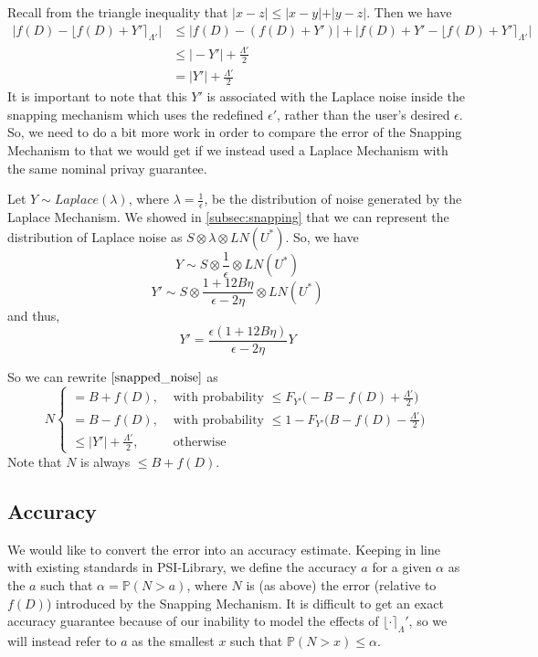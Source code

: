 \documentclass[11pt]{scrartcl} %
\begin{document}
Recall from the triangle inequality that $\vert x-z \vert \leq \vert x-y \vert + \vert y-z \vert$. Then we have
\begin{align}
\big\vert f(D) - \lfloor f(D) + Y' \rceil_{\Lambda'} \big\vert \nonumber &\leq \big\vert f(D) - (f(D) + Y') \big\vert + \big\vert f(D) + Y' - \lfloor f(D) + Y' \rceil_{\Lambda'} \big\vert \nonumber \\
                                                                        &\leq \vert -Y' \vert + \frac{\Lambda'}{2} \nonumber \\
	                                                                    &= \vert Y' \vert + \frac{\Lambda'}{2} \nonumber
\end{align}
It is important to note that this $Y'$ is associated with the Laplace noise inside the snapping mechanism which uses the redefined $\epsilon'$, rather than the user's desired $\epsilon$. So, we need to do a bit more work in order to compare the error of the Snapping Mechanism to that we would get if we instead used a Laplace Mechanism with the same nominal privay guarantee. \newline

Let $Y \sim Laplace(\lambda)$, where $\lambda = \frac{1}{\epsilon}$, be the distribution of noise generated by the Laplace Mechanism.
We showed in \autoref{subsec:snapping} that we can represent the distribution of Laplace noise as $S \otimes \lambda \otimes LN(U^*)$. So, we have
\[ Y \sim S \otimes \frac{1}{\epsilon} \otimes LN(U^*) \]
\[ Y' \sim S \otimes \frac{1 + 12B\eta}{\epsilon - 2\eta} \otimes LN(U^*) \]
and thus,
\[ Y' = \frac{\epsilon(1 + 12B\eta)}{\epsilon - 2\eta}Y \]

So we can rewrite $\eqref{snapped_noise}$ as
\begin{equation}
	\label{snapped_noise_rewrite}
	N
		\begin{cases}
			= B + f(D), &\text{ with probability } \leq F_{Y'} \big( -B - f(D) + \frac{\Lambda'}{2} \big)  \\
			= B - f(D), &\text{ with probability } \leq 1 - F_{Y'} \big( B - f(D) - \frac{\Lambda'}{2} \big)  \\
			\leq \vert Y' \vert + \frac{\Lambda'}{2}, &\text{ otherwise }
		\end{cases}
\end{equation}
Note that $N$ is always $\leq B + f(D)$.

\subsection{Accuracy}
\label{subsec:accuracy}
We would like to convert the error into an accuracy estimate. Keeping in line with existing standards in PSI-Library, we define the accuracy $a$ for a given $\alpha$ as the $a$ such that $\alpha = \mathbb{P}(N > a)$, where $N$ is (as above) the error (relative to $f(D)$) introduced by the Snapping Mechanism. It is difficult to get an exact accuracy guarantee because of our inability to model the effects of $\lfloor \cdot \rceil_\Lambda'$, so we will instead refer to $a$ as the smallest $x$ such that $\mathbb{P}(N > x) \leq \alpha$. \newline
\end{document}
